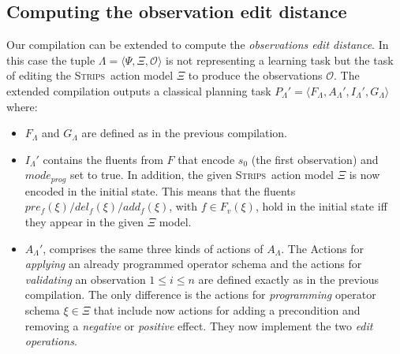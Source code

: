 \documentclass{article}
\newcommand{\tup}[1]{{\langle #1 \rangle}}
\newcommand{\strips}{\textsc{Strips}}     %
\begin{document}


\subsection{Computing the observation edit distance}
Our compilation can be extended to compute the {\em observations edit distance}. In this case the tuple $\Lambda=\tup{\Psi,\Xi,\mathcal{O}}$ is not representing a learning task but the task of editing the \strips\ action model $\Xi$ to produce the observations $\mathcal{O}$. The extended compilation outputs a classical planning task $P_{\Lambda}'=\tup{F_{\Lambda},A_{\Lambda}',I_{\Lambda}',G_{\Lambda}}$ where:
\begin{itemize}
\item $F_{\Lambda}$ and $G_{\Lambda}$ are defined as in the previous compilation.
\item $I_{\Lambda}'$ contains the fluents from $F$ that encode $s_0$ (the first observation) and $mode_{prog}$ set to true. In addition, the given \strips\ action model $\Xi$ is now encoded in the initial state. This means that the fluents $pre_f(\xi)/del_f(\xi)/add_f(\xi)$, with $f\in F_v(\xi)$, hold in the initial state iff they appear in the given $\Xi$ model.
\item $A_{\Lambda}'$, comprises the same three kinds of actions of $A_{\Lambda}$. The Actions for {\em applying} an already programmed operator schema and the actions for {\em validating} an observation {\tt\small $1\leq i\leq n$} are defined exactly as in the previous compilation. The only difference is the actions for {\em programming} operator schema $\xi\in\Xi$ that include now actions for adding a precondition and removing a {\em negative} or {\em positive} effect. They now implement the two {\em edit operations}. 
\end{itemize}
\end{document}
